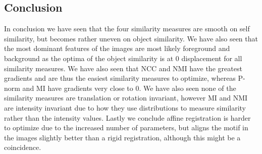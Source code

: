 \subsection{Conclusion}
In conclusion we have seen that the four similarity measures are smooth on self similarity, but becomes rather uneven on object similarity. We have also seen that the most dominant features of the images are most likely foreground and background as the optima of the object similarity is at 0 displacement for all similarity measures. We have also seen that NCC and NMI have the greatest gradients and are thus the easiest similarity measures to optimize, whereas P-norm and MI have gradients very close to 0. We have also seen none of the similarity measures are translation or rotation invariant, however MI and NMI are intensity invariant due to how they use distributions to measure similarity rather than the intensity values. Lastly we conclude affine registration is harder to optimize due to the increased number of parameters, but aligns the motif in the images slightly better than a rigid registration, although this might be a coincidence.